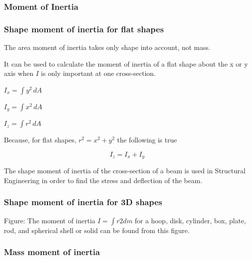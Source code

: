 \subsubsection{Moment of Inertia}
\label{sss:mome-0a81}


\subsubsection{Shape moment of inertia for flat shapes}
\label{sss:shap-34d4}


The area moment of inertia takes only shape into account, not mass.


It can be used to calculate the moment of inertia of a flat shape about the x or y axis when $I$ is only important at one cross-section.


$I_x=\int y^2\,dA$


$I_y=\int x^2\,dA$


$I_z =\int r^2\,dA$


Because, for flat shapes, $r^2=x^2 + y^2$ the following is true

\[
I_z = I_x + I_y
\]


The shape moment of inertia of the cross-section of a beam is used in Structural Engineering in order to find the stress and deflection of the beam.


\subsubsection{Shape moment of inertia for 3D shapes}
\label{sss:shap-a7a8}




Figure: The moment of inertia $I=\int r2dm$ for a hoop, disk, cylinder, box, plate, rod, and spherical shell or solid can be found from this figure.


\subsubsection{Mass moment of inertia}
\label{sss:mass-ff43}


